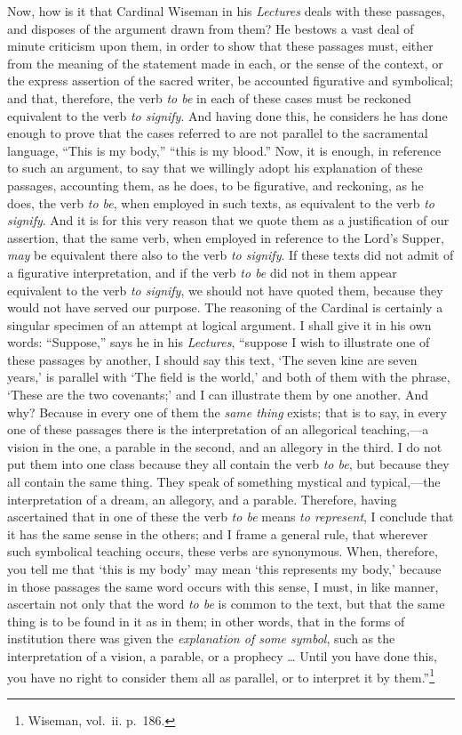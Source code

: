 \documentclass[english,]{book}
\begin{document}
Now, how is it that Cardinal Wiseman in his \emph{Lectures} deals with these passages, and disposes of the argument drawn from them? He bestows a vast deal of minute criticism upon them, in order to show that these passages must, either from the meaning of the statement made in each, or the sense of the context, or the express assertion of the sacred writer, be accounted figurative and symbolical; and that, therefore, the verb \emph{to be} in each of these cases must be reckoned equivalent to the verb \emph{to signify}. And having done this, he considers he has done enough to prove that the cases referred to are not parallel to the sacramental language, ``This is my body,'' ``this is my blood.'' Now, it is enough, in reference to such an argument, to say that we willingly adopt his explanation of these passages, accounting them, as he does, to be figurative, and reckoning, as he does, the verb \emph{to be}, when employed in such texts, as equivalent to the verb \emph{to signify}. And it is for this very reason that we quote them as a justification of our assertion, that the same verb, when employed in reference to the Lord's Supper, \emph{may} be equivalent there also to the verb \emph{to signify}. If these texts did not admit of a figurative interpretation, and if the verb \emph{to be} did not in them appear equivalent to the verb \emph{to signify}, we should not have quoted them, because they would not have served our purpose. The reasoning of the Cardinal is certainly a singular specimen of an attempt at logical argument. I shall give it in his own words: ``Suppose,'' says he in his \emph{Lectures}, ``suppose I wish to illustrate one of these passages by another, I should say this text, `The seven kine are seven years,' is parallel with `The field is the world,' and both of them with the phrase, `These are the two covenants;' and I can illustrate them by one another. And why? Because in every one of them the \emph{same thing} exists; that is to say, in every one of these passages there is the interpretation of an allegorical teaching,---a vision in the one, a parable in the second, and an allegory in the third. I do not put them into one class because they all contain the verb \emph{to be}, but because they all contain the same thing. They speak of something mystical and typical,---the interpretation of a dream, an allegory, and a parable. Therefore, having ascertained that in one of these the verb \emph{to be} means \emph{to represent}, I conclude that it has the same sense in the others; and I frame a general rule, that wherever such symbolical teaching occurs, these verbs are synonymous. When, therefore, you tell me that `this is my body' may mean `this represents my body,' because in those passages the same word occurs with this sense, I must, in like manner, ascertain not only that the word \emph{to be} is common to the text, but that the same thing is to be found in it as in them; in other words, that in the forms of institution there was given the \emph{explanation of some symbol}, such as the interpretation of a vision, a parable, or a prophecy \ldots{} Until you have done this, you have no right to consider them all as parallel, or to interpret it by them.''\footnote{Wiseman, vol.~ii. p.~186.}
\end{document}
